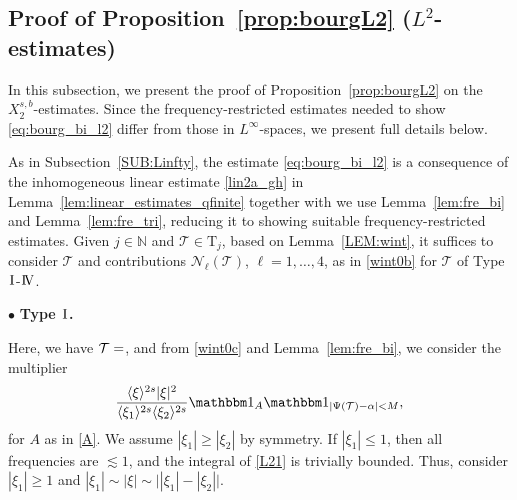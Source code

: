 \documentclass[%
11pt,  reqno]{amsart}
\makeatletter
\newcommand{\I}{\hspace{0.2mm}\textup{I}\hspace{0.2mm}}
\newcommand{\IV}{\textup{I \hspace{-2.9mm} V}}
\newcommand{\5}{\textup{V}}
\newcommand{\noi}{\noindent}
\newcommand{\ind}{\mathbbm 1}
\newcommand{\les}{\lesssim}
\theoremstyle{remark}
\newcommand{\bul}{\bullet}
\newcommand{\TT}{\mathcal{T}}
\newcommand{\Tr}{\mathrm{T}}
\newcommand{\al}{\alpha}
\newcommand{\be}{\beta}
\renewcommand{\l}{\ell}
\newcommand{\jb}[1]
{\langle #1 \rangle}
\newcommand{\N}{\mathbb{N}}
\def\<#1>{\csname MH@symb@#1\endcsname}
\numberwithin{equation}{section}
\numberwithin{theorem}{section}
\newcommand{\Ncal}{\mathcal{N}}
\makeatother
\begin{document}













\subsection{Proof of Proposition~\ref{prop:bourgL2} ($L^2$-estimates)}
\label{SUB:L2}


In this subsection, we present the proof of Proposition~\ref{prop:bourgL2}
on the $X^{s, b}_{2}$-estimates. 
Since the frequency-restricted estimates needed to show \eqref{eq:bourg_bi_l2} differ from those in $L^\infty$-spaces, we present full details below. 




As in Subsection~\ref{SUB:Linfty}, 
the estimate \eqref{eq:bourg_bi_l2} is a consequence of the inhomogeneous linear estimate \eqref{lin2a_gh} in Lemma~\ref{lem:linear_estimates_qfinite} together with
we use Lemma~\ref{lem:fre_bi} and Lemma~\ref{lem:fre_tri}, reducing it to showing suitable frequency-restricted  estimates. 
Given $j\in \N$ and $\TT\in \Tr_j$,
based on Lemma~\ref{LEM:wint}, it suffices to consider $\TT$ and contributions $\Ncal_
\l(\TT)$, $\l=1, \ldots, 4$, as in \eqref{wint0b} for $\TT$ of Type $\I$-$\IV$. 


\smallskip

\noi
$\bul$ \textbf{Type $\I$.}

Here, we have $\TT = \<1>$, and
from \eqref{wint0c} and Lemma~\ref{lem:fre_bi}, we consider the multiplier
\begin{align}
\label{L21}
 \frac{\jb{\xi}^{2s} |\xi|^2 }{\jb{\xi_1}^{2s}\jb{\xi_2}^{2s}} 
    \ind_A \ind_{|\Psi(\TT) - \al| < M } , 
\end{align}
 for $A$ as in \eqref{A}. We assume $|\xi_1| \ge |\xi_2|$ by symmetry. 
If $|\xi_1| \le 1$, then all frequencies are $\les 1$, and the integral of \eqref{L21} is trivially bounded. Thus, consider $|\xi_1| \ge 1$ and $|\xi_1| \sim |\xi| \sim \big| |\xi_1| - |\xi_2| \big|$.
\end{document}
